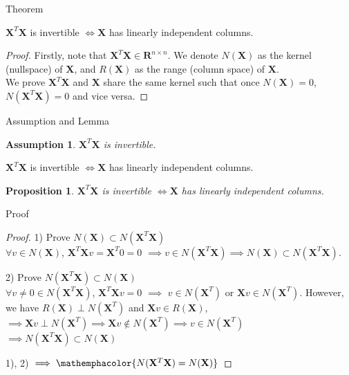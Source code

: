 \documentclass{beamer}
\newtheorem{assumption}{Assumption}
\newtheorem{proposition}{Proposition}
\begin{document}
	\begin{frame}{Theorem}
		\begin{theorem}
			$\mathbf{X}^T\mathbf{X}$ is invertible $\iff \mathbf{X}$ has linearly independent columns.
		\end{theorem}\pause
		\vspace{0.2in}
		\begin{proof}
			Firstly, note that $\mathbf{X}^T\mathbf{X} \in \mathbf{R}^{n \times n}$. We denote $N(\mathbf{X})$ as the kernel (nullspace) of $\mathbf{X}$, and $R(\mathbf{X})$ as the range (column space) of $\mathbf{X}$. \\
			We prove $\mathbf{X}^T\mathbf{X}$ and $\mathbf{X}$ share the same kernel such that once $N(\mathbf{X}) = 0$, $N(\mathbf{X}^T\mathbf{X}) = 0$ and vice versa.
		\end{proof}
	\end{frame}

	\begin{frame}{Assumption and Lemma}
	\begin{assumption}
		$\mathbf{X}^T\mathbf{X}$ is invertible.
	\end{assumption}
	
	\begin{lemma}
		$\mathbf{X}^T\mathbf{X}$ is invertible $\iff \mathbf{X}$ has linearly independent columns.
	\end{lemma}
	
	\begin{proposition}
	$\mathbf{X}^T\mathbf{X}$ is invertible $\iff \mathbf{X}$ has linearly independent columns.
	\end{proposition}

	\end{frame}

	
	\begin{frame}{Proof}
		\begin{proof}
			1) Prove $N(\mathbf{X}) \subset N(\mathbf{X}^T\mathbf{X})$ \\
			$\forall v \in N(\mathbf{X})$, $\mathbf{X}^T\mathbf{X}v = \mathbf{X}^T0 = 0$ $\implies v \in N(\mathbf{X}^T\mathbf{X}) \implies N(\mathbf{X}) \subset N(\mathbf{X}^T\mathbf{X})$. \\ \pause
			
			\vspace{0.2in}
			2) Prove $N(\mathbf{X}^T\mathbf{X}) \subset N(\mathbf{X})$ \\
			$\forall v\neq 0 \in N(\mathbf{X}^T\mathbf{X})$, $\mathbf{X}^T\mathbf{X}v = 0$ $\implies$ $v \in N(\mathbf{X}^T)$ or $\mathbf{X}v \in N(\mathbf{X}^T)$. However, we have $R(\mathbf{X}) \perp N(\mathbf{X}^T)$ and $\mathbf{X}v \in R(\mathbf{X})$, $\implies \mathbf{X}v \perp N(\mathbf{X}^T) \implies \mathbf{X}v \notin N(\mathbf{X}^T) \implies v \in N(\mathbf{X}^T)$
			$\implies N(\mathbf{X}^T\mathbf{X}) \subset N(\mathbf{X})$ \\ \pause
			
			\vspace{0.2in}
			1), 2) $\implies \mathemphacolor{N(\mathbf{X}^T\mathbf{X}) = N(\mathbf{X})}$
		\end{proof}
	\end{frame}
	
\end{document}
